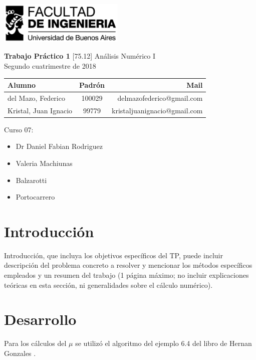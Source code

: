 \documentclass[11pt,a4paper]{article}
\begin{document}
\begin{titlepage}
	\hfill\includegraphics[width=6cm]{fiuba.jpg}
    \begin{center}
    \vfill
    \Huge \textbf{Trabajo Práctico 1}
    \vskip2cm
    \Large [75.12] Análisis Numérico I\\
    Segundo cuatrimestre de 2018
    \vfill
    \begin{tabular}{|l|c|r|}
	\hline
	Alumno & Padrón & Mail\\
	\hline
	\hline
	del Mazo, Federico & 100029 & delmazofederico@gmail.com\\
	\hline
	Kristal, Juan Ignacio & 99779 & kristaljuanignacio@gmail.com\\
	\hline
	\end{tabular}
    \vskip2cm
    \end{center}

    Curso 07:

    \begin{itemize}
    \item Dr Daniel Fabian Rodriguez
    \item Valeria Machiunas
    \item Balzarotti
    \item Portocarrero
    \end{itemize}

\end{titlepage}



\tableofcontents
\thispagestyle{onlyheader}
\newpage


\setcounter{page}{1}

\section{Introducción}
Introducción, que incluya los objetivos específicos del TP, puede incluir descripción del
problema concreto a resolver y mencionar los métodos específicos empleados y un resumen del
trabajo (1 página máximo; no incluir explicaciones teóricas en esta sección, ni generalidades
sobre el cálculo numérico).

\section{Desarrollo}
Para los cálculos del \(\mu\) se utilizó el algoritmo del ejemplo 6.4 del libro de Hernan Gonzales \cite{Gonzales}.
 
\end{document}
